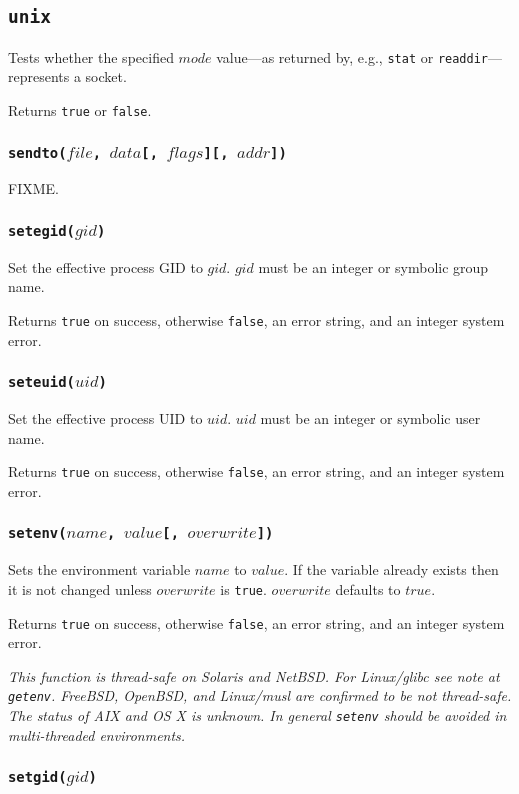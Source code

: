 \documentclass[11pt, oneside]{memoir}
\newcommand*{\true}[0]{\texttt{true}\xspace}
\newcommand*{\false}[0]{\texttt{false}\xspace}
\newcommand*{\syscall}[1]{\texttt{#1}\xspace}
\newcommand*{\fn}[1]{\texttt{#1}\xspace}
\newcounter{toccols}
\newenvironment{Module}[1]{
	\subsection{\texttt{#1}}
	\addtocontents{toc}{
		\protect\begin{multicols}{\value{toccols}}
	}
}{
	\addtocontents{toc}{\protect\end{multicols}}
}
\begin{document}
\begin{Module}{unix}
Tests whether the specified $mode$ value---as returned by, e.g., \syscall{stat} or \syscall{readdir}---represents a socket.

Returns \true or \false.

\subsubsection[\fn{sendto}]{\fn{sendto($file$, $data$[, $flags$][, $addr$])}}

FIXME.

\subsubsection[\fn{setegid}]{\fn{setegid($gid$)}}

Set the effective process GID to $gid$. $gid$ must be an integer or symbolic group name.

Returns \true on success, otherwise \false, an error string, and an integer system error.

\subsubsection[\fn{seteuid}]{\fn{seteuid($uid$)}}

Set the effective process UID to $uid$. $uid$ must be an integer or symbolic user name.

Returns \true on success, otherwise \false, an error string, and an integer system error.

\subsubsection[\fn{setenv}]{\fn{setenv($name$, $value$[, $overwrite$])}}

Sets the environment variable $name$ to $value$. If the variable already exists then it is not changed unless $overwrite$ is \true. $overwrite$ defaults to $true$.

Returns \true on success, otherwise \false, an error string, and an integer system error.

\emph{This function is thread-safe on Solaris and NetBSD. For Linux/glibc see note at \fn{getenv}. FreeBSD, OpenBSD, and Linux/musl are confirmed to be not thread-safe. The status of AIX and OS X is unknown. In general \fn{setenv} should be avoided in multi-threaded environments.}

\subsubsection[\fn{setgid}]{\fn{setgid($gid$)}}


\end{Module}
\end{document}

